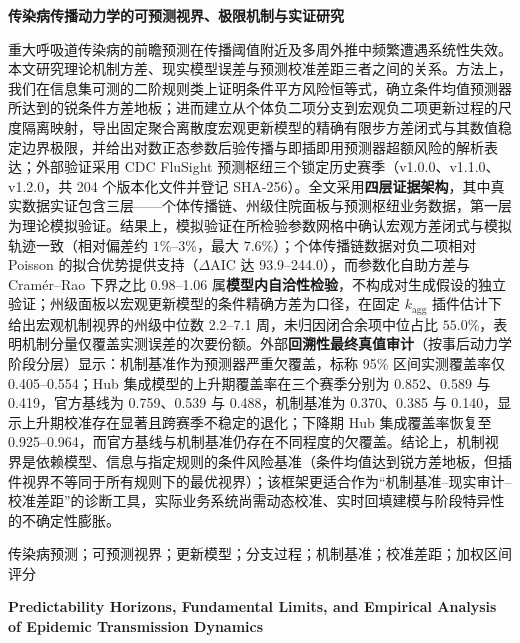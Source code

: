 \documentclass[11pt,a4paper]{article}
\theoremstyle{plain}
\theoremstyle{definition}
\begin{document}
\thispagestyle{plain}
\setcounter{section}{-1}

\begin{center}
    \vspace*{0.5em}
    {\heiti\bfseries 传染病传播动力学的可预测视界、极限机制与实证研究} \\[1.8em]
\end{center}

重大呼吸道传染病的前瞻预测在传播阈值附近及多周外推中频繁遭遇系统性失效。本文研究理论机制方差、现实模型误差与预测校准差距三者之间的关系。方法上，我们在信息集可测的二阶规则类上证明条件平方风险恒等式，确立条件均值预测器所达到的锐条件方差地板；进而建立从个体负二项分支到宏观负二项更新过程的尺度隔离映射，导出固定聚合离散度宏观更新模型的精确有限步方差闭式与其数值稳定边界极限，并给出对数正态参数后验传播与即插即用预测器超额风险的解析表达；外部验证采用 CDC FluSight 预测枢纽三个锁定历史赛季（v1.0.0、v1.1.0、v1.2.0，共 204 个版本化文件并登记 SHA-256）。全文采用\textbf{四层证据架构}，其中真实数据实证包含三层——个体传播链、州级住院面板与预测枢纽业务数据，第一层为理论模拟验证。结果上，模拟验证在所检验参数网格中确认宏观方差闭式与模拟轨迹一致（相对偏差约 $1\%$--$3\%$，最大 $7.6\%$）；个体传播链数据对负二项相对 Poisson 的拟合优势提供支持（$\Delta\text{AIC}$ 达 93.9--244.0），而参数化自助方差与 Cramér--Rao 下界之比 0.98--1.06 属\textbf{模型内自洽性检验}，不构成对生成假设的独立验证；州级面板以宏观更新模型的条件精确方差为口径，在固定 $k_{\text{agg}}$ 插件估计下给出宏观机制视界的州级中位数 2.2--7.1 周，未归因闭合余项中位占比 $55.0\%$，表明机制分量仅覆盖实测误差的次要份额。外部\textbf{回溯性最终真值审计}（按事后动力学阶段分层）显示：机制基准作为预测器严重欠覆盖，标称 95\% 区间实测覆盖率仅 0.405--0.554；Hub 集成模型的上升期覆盖率在三个赛季分别为 0.852、0.589 与 0.419，官方基线为 0.759、0.539 与 0.488，机制基准为 0.370、0.385 与 0.140，显示上升期校准存在显著且跨赛季不稳定的退化；下降期 Hub 集成覆盖率恢复至 0.925--0.964，而官方基线与机制基准仍存在不同程度的欠覆盖。结论上，机制视界是依赖模型、信息与指定规则的条件风险基准（条件均值达到锐方差地板，但插件视界不等同于所有规则下的最优视界）；该框架更适合作为“机制基准--现实审计--校准差距”的诊断工具，实际业务系统尚需动态校准、实时回填建模与阶段特异性的不确定性膨胀。

\vspace{0.8em}
传染病预测；可预测视界；更新模型；分支过程；机制基准；校准差距；加权区间评分

\vspace{1.2em}
\begin{center}
    {\heiti\bfseries Predictability Horizons, Fundamental Limits, and Empirical Analysis of Epidemic Transmission Dynamics} \\[1.0em]
\end{center}
\end{document}
